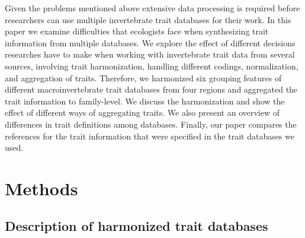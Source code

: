 \documentclass{article}
\begin{document}
Given the problems mentioned above extensive data processing is required before researchers can use multiple invertebrate trait databases for their work. In this paper we examine difficulties that ecologists face when synthesizing trait information from multiple databases. We explore the effect of different decisions researches have to make when working with invertebrate trait data from several sources, involving trait harmonization, handling different codings, normalization, and aggregation of traits.
Therefore, we harmonized six grouping features of different macroinvertebrate trait databases from four regions and aggregated the trait information to family-level. %
We discuss the harmonization and show the effect of different ways of aggregating traits. We also present an overview of differences in trait definitions among databases. Finally, our paper compares the references for the trait information that were specified in the trait databases we used.

\section{Methods}

\subsection{Description of harmonized trait databases} 
\end{document}

